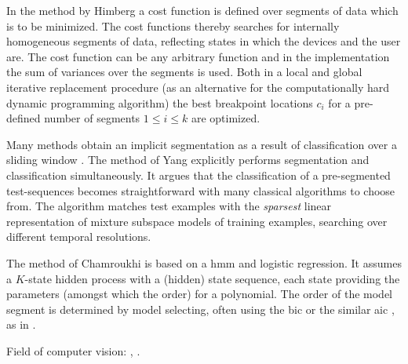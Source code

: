 In the method by Himberg \etal \cite{himberg2001time} a cost function is defined over segments of data which is to be minimized.
The cost functions thereby searches for internally homogeneous segments of data, reflecting states in which the devices and the user are.
The cost function can be any arbitrary function and in the implementation the sum of variances over the segments is used.
Both in a local and global iterative replacement procedure (as an alternative for the computationally hard dynamic programming algorithm) the best breakpoint locations $c_i$ for a pre-defined number of segments $1 \leq i \leq k$ are optimized.

Many methods obtain an implicit segmentation as a result of classification over a sliding window .
The method of Yang \etal \cite{yang2008distributed} explicitly performs segmentation and classification simultaneously.
It argues that the classification of a pre-segmented test-sequences becomes straightforward with many classical algorithms to choose from.
The algorithm matches test examples with the \emph{sparsest} linear representation of mixture subspace models of training examples, searching over different temporal resolutions.

The method of Chamroukhi \etal \cite{chamroukhi2013joint} is based on a \gls{hmm} and logistic regression.
It assumes a $K$-state hidden process with a (hidden) state sequence, each state providing the parameters (amongst which the order) for a polynomial.
The order of the model segment is determined by model selecting, often using the \gls{bic} or the similar \gls{aic} \cite{akaike1974new}, as in \cite{he2008activity}.

Field of computer vision: \cite{zhou2008aligned}, \cite{li2007segmentation}.





